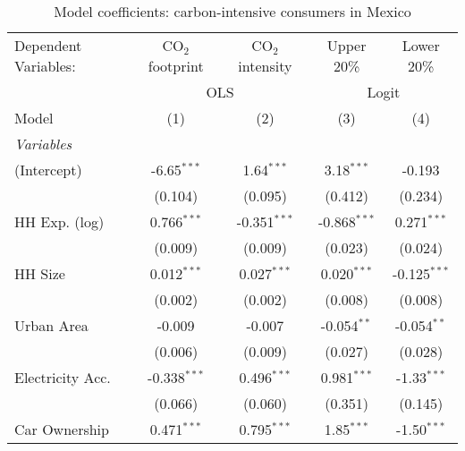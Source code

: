 
\begin{table}[htbp!]
   \centering
   \small
   \begin{adjustbox}{width = 1\textwidth, max height = 0.95\textheight, center}
      \begin{threeparttable}[b]
         \caption{\label{tab:Logit_1_MEX} Model coefficients: carbon-intensive consumers in Mexico}
         \begin{tabular}{lcccc}
            \tabularnewline \midrule \midrule
            Dependent Variables: & CO$_{2}$ footprint & CO$_{2}$ intensity & Upper 20\%     & Lower 20\%\\   
             & \multicolumn{2}{c}{OLS} & \multicolumn{2}{c}{Logit} \\ 
            Model                & (1)                & (2)                & (3)            & (4)\\  
            \midrule
            \emph{Variables}\\
            (Intercept)          & -6.65$^{***}$      & 1.64$^{***}$       & 3.18$^{***}$   & -0.193\\   
                                 & (0.104)            & (0.095)            & (0.412)        & (0.234)\\   
            HH Exp. (log)        & 0.766$^{***}$      & -0.351$^{***}$     & -0.868$^{***}$ & 0.271$^{***}$\\   
                                 & (0.009)            & (0.009)            & (0.023)        & (0.024)\\   
            HH Size              & 0.012$^{***}$      & 0.027$^{***}$      & 0.020$^{***}$  & -0.125$^{***}$\\   
                                 & (0.002)            & (0.002)            & (0.008)        & (0.008)\\   
            Urban Area           & -0.009             & -0.007             & -0.054$^{**}$  & -0.054$^{**}$\\   
                                 & (0.006)            & (0.009)            & (0.027)        & (0.028)\\   
            Electricity Acc.     & -0.338$^{***}$     & 0.496$^{***}$      & 0.981$^{***}$  & -1.33$^{***}$\\   
                                 & (0.066)            & (0.060)            & (0.351)        & (0.145)\\   
            Car Ownership        & 0.471$^{***}$      & 0.795$^{***}$      & 1.85$^{***}$   & -1.50$^{***}$\\   

\end{tabular}
\end{threeparttable}
\end{adjustbox}
\end{table}
